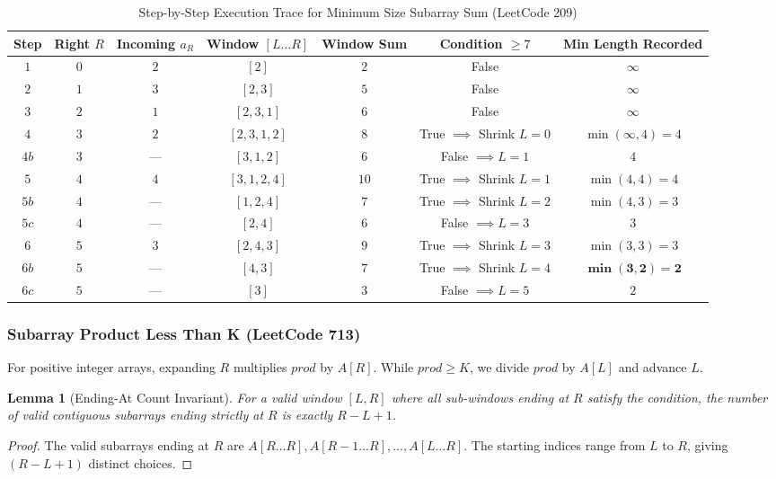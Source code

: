 \documentclass[10pt,journal,compsoc,onecolumn]{IEEEtran}
\newtheorem{lemma}[theorem]{Lemma}
\begin{document}
\begin{table}[htbp]
\caption{Step-by-Step Execution Trace for Minimum Size Subarray Sum (LeetCode 209)}
\label{tab:trace_lc209}
\centering
\begin{tabular}{ccccccc}
\toprule
\textbf{Step} & \textbf{Right $R$} & \textbf{Incoming $a_R$} & \textbf{Window $[L \dots R]$} & \textbf{Window Sum} & \textbf{Condition $\ge 7$} & \textbf{Min Length Recorded} \\
\midrule
$1$ & $0$ & $2$ & $[2]$ & $2$ & False & $\infty$ \\
$2$ & $1$ & $3$ & $[2, 3]$ & $5$ & False & $\infty$ \\
$3$ & $2$ & $1$ & $[2, 3, 1]$ & $6$ & False & $\infty$ \\
$4$ & $3$ & $2$ & $[2, 3, 1, 2]$ & $8$ & True $\implies$ Shrink $L=0$ & $\min(\infty, 4) = 4$ \\
$4b$ & $3$ & --- & $[3, 1, 2]$ & $6$ & False $\implies L=1$ & $4$ \\
$5$ & $4$ & $4$ & $[3, 1, 2, 4]$ & $10$ & True $\implies$ Shrink $L=1$ & $\min(4, 4) = 4$ \\
$5b$ & $4$ & --- & $[1, 2, 4]$ & $7$ & True $\implies$ Shrink $L=2$ & $\min(4, 3) = 3$ \\
$5c$ & $4$ & --- & $[2, 4]$ & $6$ & False $\implies L=3$ & $3$ \\
$6$ & $5$ & $3$ & $[2, 4, 3]$ & $9$ & True $\implies$ Shrink $L=3$ & $\min(3, 3) = 3$ \\
$6b$ & $5$ & --- & $[4, 3]$ & $7$ & True $\implies$ Shrink $L=4$ & $\mathbf{\min(3, 2) = 2}$ \\
$6c$ & $5$ & --- & $[3]$ & $3$ & False $\implies L=5$ & $2$ \\
\bottomrule
\end{tabular}
\end{table}

\subsubsection{Subarray Product Less Than K (LeetCode 713)}
For positive integer arrays, expanding $R$ multiplies $prod$ by $A[R]$. While $prod \ge K$, we divide $prod$ by $A[L]$ and advance $L$.
\begin{lemma}[Ending-At Count Invariant]
For a valid window $[L, R]$ where all sub-windows ending at $R$ satisfy the condition, the number of valid contiguous subarrays ending strictly at $R$ is exactly $R - L + 1$.
\end{lemma}
\begin{proof}
The valid subarrays ending at $R$ are $A[R \dots R], A[R-1 \dots R], \dots, A[L \dots R]$. The starting indices range from $L$ to $R$, giving $(R - L + 1)$ distinct choices.
\end{proof}
\end{document}

